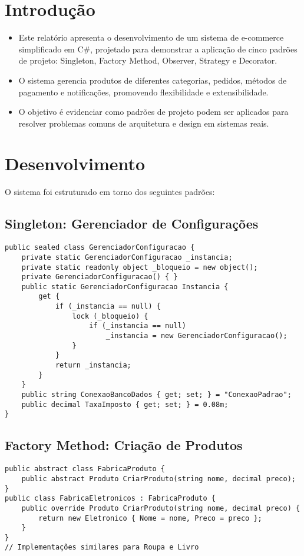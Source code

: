 \documentclass[
    12pt,
    oneside,
    a4paper,
    english,
    brazil,
]{abntex2}
\begin{document}
\frenchspacing
\imprimircapa
\textual

\section{Introdução}
\begin{itemize}
    \item Este relatório apresenta o desenvolvimento de um sistema de e-commerce simplificado em C\#, projetado para demonstrar a aplicação de cinco padrões de projeto: Singleton, Factory Method, Observer, Strategy e Decorator.
    \item O sistema gerencia produtos de diferentes categorias, pedidos, métodos de pagamento e notificações, promovendo flexibilidade e extensibilidade.
    \item O objetivo é evidenciar como padrões de projeto podem ser aplicados para resolver problemas comuns de arquitetura e design em sistemas reais.
\end{itemize}

\section{Desenvolvimento}
O sistema foi estruturado em torno dos seguintes padrões:

\subsection{Singleton: Gerenciador de Configurações}
\begin{lstlisting}[caption={Singleton para configurações globais}]
public sealed class GerenciadorConfiguracao {
    private static GerenciadorConfiguracao _instancia;
    private static readonly object _bloqueio = new object();
    private GerenciadorConfiguracao() { }
    public static GerenciadorConfiguracao Instancia {
        get {
            if (_instancia == null) {
                lock (_bloqueio) {
                    if (_instancia == null)
                        _instancia = new GerenciadorConfiguracao();
                }
            }
            return _instancia;
        }
    }
    public string ConexaoBancoDados { get; set; } = "ConexaoPadrao";
    public decimal TaxaImposto { get; set; } = 0.08m;
}
\end{lstlisting}

\subsection{Factory Method: Criação de Produtos}
\begin{lstlisting}[caption={Factory para produtos}]
public abstract class FabricaProduto {
    public abstract Produto CriarProduto(string nome, decimal preco);
}
public class FabricaEletronicos : FabricaProduto {
    public override Produto CriarProduto(string nome, decimal preco) {
        return new Eletronico { Nome = nome, Preco = preco };
    }
}
// Implementações similares para Roupa e Livro
\end{lstlisting}
\end{document}
